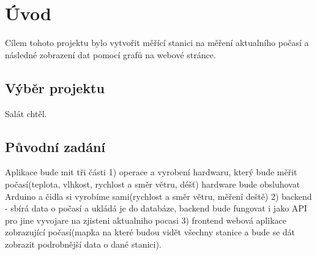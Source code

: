 \section{Úvod}
Cílem tohoto projektu bylo vytvořit měřící stanici na měření aktualního počasí a následné zobrazení dat pomocí grafů na webové stránce.

\subsection{Výběr projektu}
Salát chtěl.

\subsection{Původní zadání}
Aplikace bude mit tři části 1) operace a vyrobení hardwaru, který bude měřit počasí(teplota, vlhkost, rychlost a směr větru, déšť) hardware bude obsluhovat Arduino a čidla si vyrobíme sami(rychlost a směr větru, měření deště) 2) backend - sbírá data o počasí a ukládá je do databáze, backend bude fungovat i jako API pro jine vyvojare na zjisteni aktualniho pocasi 3) frontend webová aplikace zobrazující počasí(mapka na které budou vidět všechny stanice a bude se dát zobrazit podrobnější data o dané stanici).
